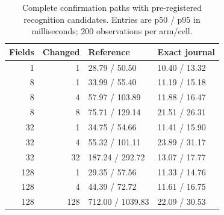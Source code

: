 \begin{table}[htbp]
\centering\small
\caption{Complete confirmation paths with pre-registered recognition candidates. Entries are p50 / p95 in milliseconds; 200 observations per arm/cell.}
\label{tab:s-mechanism-grid}
\begin{tabular}{@{}rrll@{}}
\toprule
Fields & Changed & Reference & Exact journal \\
\midrule
1 & 1 & 28.79 / 50.50 & 10.40 / 13.32 \\
8 & 1 & 33.99 / 55.40 & 11.19 / 15.18 \\
8 & 4 & 57.97 / 103.89 & 11.88 / 16.47 \\
8 & 8 & 75.71 / 129.14 & 21.51 / 26.31 \\
32 & 1 & 34.75 / 54.66 & 11.41 / 15.90 \\
32 & 4 & 55.32 / 101.11 & 23.89 / 31.17 \\
32 & 32 & 187.24 / 292.72 & 13.07 / 17.77 \\
128 & 1 & 29.35 / 57.56 & 11.33 / 14.76 \\
128 & 4 & 44.39 / 72.72 & 11.61 / 16.75 \\
128 & 128 & 712.00 / 1039.83 & 22.09 / 30.53 \\
\bottomrule\end{tabular}\end{table}
